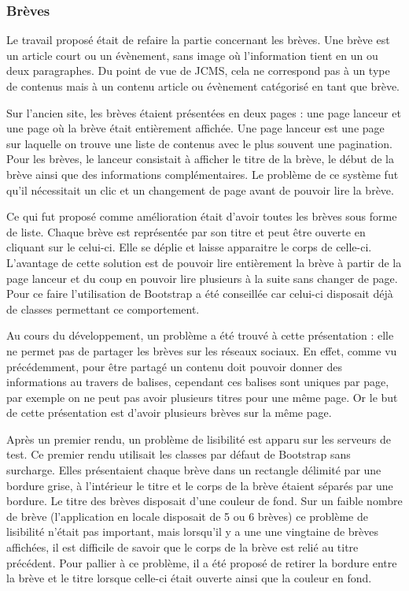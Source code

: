 \documentclass[12pt,a4paper]{article}
\begin{document}
\subsubsection{Brèves}
Le travail proposé était de refaire la partie concernant les brèves. Une brève est un article court ou un évènement, sans image où l'information tient en un ou deux paragraphes. Du point de vue de \gls{JCMS}, cela ne correspond pas à un type de contenus mais à un contenu article ou évènement catégorisé en tant que brève.\par
\medskip
Sur l'ancien site, les brèves étaient présentées en deux pages : une page lanceur et une page où la brève était entièrement affichée. Une page lanceur est une page sur laquelle on trouve une liste de contenus avec le plus souvent une pagination. Pour les brèves, le lanceur consistait à afficher le titre de la brève, le début de la brève ainsi que des informations complémentaires. Le problème de ce système fut qu'il nécessitait un clic et un changement de page avant de pouvoir lire la brève.\par
Ce qui fut proposé comme amélioration était d'avoir toutes les brèves sous forme de liste. Chaque brève est représentée par son titre et peut être ouverte en cliquant sur le celui-ci. Elle se déplie et laisse apparaitre le corps de celle-ci. L'avantage de cette solution est de pouvoir lire entièrement la brève à partir de la page lanceur et du coup en pouvoir lire plusieurs à la suite sans changer de page. Pour ce faire l'utilisation de Bootstrap a été conseillée car celui-ci disposait déjà de classes permettant ce comportement.\par
\medskip
Au cours du développement, un problème a été trouvé à cette présentation : elle ne permet pas de partager les brèves sur les réseaux sociaux. En effet, comme vu précédemment, pour être partagé un contenu doit pouvoir donner des informations au travers de balises, cependant ces balises sont uniques par page, par exemple on ne peut pas avoir plusieurs titres pour une même page. Or le but de cette présentation est d'avoir plusieurs brèves sur la même page.\par
Après un premier rendu, un problème de lisibilité est apparu sur les serveurs de test. Ce premier rendu utilisait les classes par défaut de Bootstrap sans surcharge. Elles présentaient chaque brève dans un rectangle délimité par une bordure grise, à l'intérieur le titre et le corps de la brève étaient séparés par une bordure. Le titre des brèves disposait d'une couleur de fond. Sur un faible nombre de brève (l'application en locale disposait de 5 ou 6 brèves) ce problème de lisibilité n'était pas important, mais lorsqu'il y a une une vingtaine de brèves affichées, il est difficile de savoir que le corps de la brève est relié au titre précédent. Pour pallier à ce problème, il a été proposé de retirer la bordure entre la brève et le titre lorsque celle-ci était ouverte ainsi que la couleur en fond.\par
\end{document}
